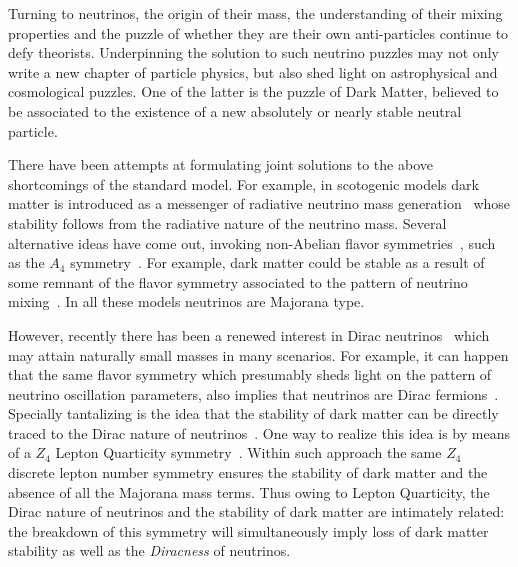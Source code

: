 \documentclass[english,10pt,aps,prd,a4paper,preprintnumbers,floatfix,nofootinbib,showpacs,superscriptaddress]{revtex4-1}
\begin{document}
Turning to neutrinos, the origin of their mass, the understanding of
their mixing properties and the puzzle of whether they are their own
anti-particles continue to defy theorists.  Underpinning the solution
to such neutrino puzzles may not only write a new chapter of particle
physics, but also shed light on astrophysical and cosmological
puzzles.
%
One of the latter is the puzzle of Dark Matter, believed to be
associated to the existence of a new absolutely or nearly stable
neutral particle.

There have been attempts at formulating joint solutions to the above
shortcomings of the standard model.
%
For example, in scotogenic models dark matter is introduced as a
messenger of radiative neutrino mass
generation~\cite{Ma:2006km,Hirsch:2013ola,Merle:2016scw} whose
stability follows from the radiative nature of the neutrino mass.
%
Several alternative ideas have come out, invoking non-Abelian flavor
symmetries~\cite{Hirsch:2012ym,Morisi:2012fg,King:2014nza}, such as
the $A_4$ symmetry~\cite{Ma:2001dn,Babu:2002dz,Morisi:2013qna}.
%
For example, dark matter could be stable as a result of some remnant
of the flavor symmetry associated to the pattern of neutrino
mixing~\cite{Hirsch:2010ru,Boucenna:2012qb}.
%
In all these models neutrinos are Majorana type. 

However, recently there has been a renewed interest in Dirac
neutrinos~\cite{Chulia:2016ngi, Chulia:2016giq, Aranda:2013gga,
  Bonilla:2016diq, Ma:2016mwh, Ma:2015raa, Ma:2015mjd,
  Bonilla:2016zef, Valle:2016kyz, Abbas:2016qbl, Abbas:2013uqh,
  Wang:2016lve, Wang:2017mcy, Okada:2014vla, Borah:2016zbd,
  Borah:2017leo} which may attain naturally small masses in many
scenarios. 
%
For example, it can happen that the same flavor symmetry which
presumably sheds light on the pattern of neutrino oscillation
parameters, also implies that neutrinos are Dirac
fermions~\cite{Aranda:2013gga}.
%
Specially tantalizing is the idea that the stability of dark matter
can be directly traced to the Dirac nature of neutrinos~\cite{
  Chulia:2016ngi, Chulia:2016giq, Bonilla:2016diq, Ma:2016mwh}.
%
One way to realize this idea is by means of a $Z_4$ Lepton Quarticity
symmetry~\cite{ Chulia:2016ngi, Chulia:2016giq}. Within such approach
the same $Z_4$ discrete lepton number symmetry ensures the stability
of dark matter and the absence of all the Majorana mass terms. Thus
owing to Lepton Quarticity, the Dirac nature of neutrinos and the
stability of dark matter are intimately related: the breakdown of this
symmetry will simultaneously imply loss of dark matter stability as
well as the \textit{Diracness} of neutrinos.
 
\end{document}
